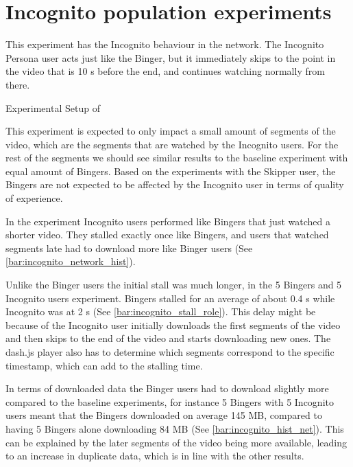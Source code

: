 \if{}

\fi
 
\FloatBarrier \section{Incognito population experiments}
\label{sec:eval_incognito}
This experiment has the Incognito behaviour in the network.
The Incognito Persona user acts just like the Binger, but it immediately skips to the point in the video that is 10 \ac{s} before the end, and continues watching normally from there.

\begin{table}[!htbp]
    \myfloatalign
    \caption[Experimental Setup of Incognito]{Experimental Setup of }
    \label{tab:exp_overview_incognito}
    
\end{table}

This experiment is expected to only impact a small amount of segments of the video, which are the segments that are watched by the Incognito users.
For the rest of the segments we should see similar results to the baseline experiment with equal amount of Bingers. Based on the experiments with the Skipper user, the Bingers are not expected to be affected by the Incognito user in terms of quality of experience.

In the experiment Incognito users performed like Bingers that just watched a shorter video. They stalled exactly once like Bingers, and users that watched segments late had to download more like Binger users (See \autoref{bar:incognito_network_hist}). 

\if{}

\fi

Unlike the Binger users the initial stall was much longer, in the 5 Bingers and 5 Incognito users experiment. Bingers stalled for an average of about 0.4 \ac{s} while Incognito was at 2 \ac{s} (See \autoref{bar:incognito_stall_role}). This delay might be because of the Incognito user initially downloads the first segments of the video and then skips to the end of the video and starts downloading new ones. The dash.js player also has to determine which segments correspond to the specific timestamp, which can add to the stalling time.

\if{}

\fi

In terms of downloaded data the Binger users had to download slightly more compared to the baseline experiments, for instance 5 Bingers with 5 Incognito users meant that the Bingers downloaded on average 145 \ac{MB}, compared to having 5 Bingers alone downloading 84 \ac{MB} (See \autoref{bar:incognito_hist_net}). This can be explained by the later segments of the video being more available, leading to an increase in duplicate data, which is in line with the other results.


